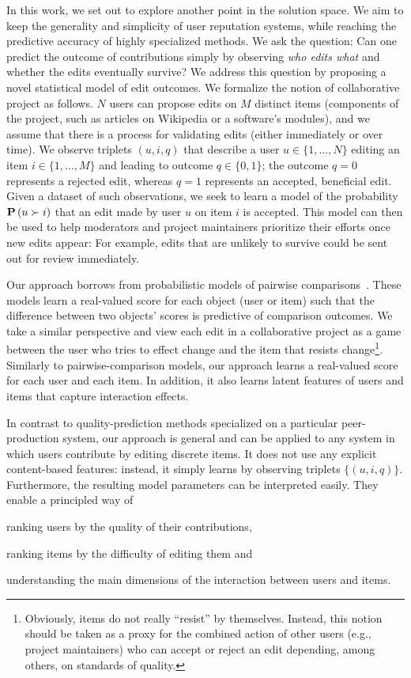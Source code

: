 In this work, we set out to explore another point in the solution space.
We aim to keep the generality and simplicity of user reputation systems, while reaching the predictive accuracy of highly specialized methods.
We ask the question:
Can one predict the outcome of contributions simply by observing \emph{who edits what} and whether the edits eventually survive?
We address this question by proposing a novel statistical model of edit outcomes.
We formalize the notion of collaborative project as follows.
$N$ users can propose edits on $M$ distinct items (components of the project, such as articles on Wikipedia or a software's modules), and we assume that there is a process for validating edits (either immediately or over time).
We observe triplets $(u, i, q)$ that describe a user $u \in \{1, \ldots, N\}$ editing an item $i \in \{1, \ldots, M\}$ and leading to outcome $q \in \{0, 1\}$;
the outcome $q = 0$ represents a rejected edit, whereas $q = 1$ represents an accepted, beneficial edit.
Given a dataset of such observations, we seek to learn a model of the probability $\mathbf{P}\left( u \succ i \right)$ that an edit made by user $u$ on item $i$ is accepted.
This model can then be used to help moderators and project maintainers prioritize their efforts once new edits appear:
For example, edits that are unlikely to survive could be sent out for review immediately.

Our approach borrows from probabilistic models of pairwise comparisons~\citep{zermelo1928berechnung, rasch1960probabilistic}.
These models learn a real-valued score for each object (user or item) such that the difference between two objects' scores is predictive of comparison outcomes.
We take a similar perspective and view each edit in a collaborative project as a game between the user who tries to effect change and the item that resists change\footnote{Obviously, items do not really ``resist'' by themselves. Instead, this notion should be taken as a proxy for the combined action of other users (e.g., project maintainers) who can accept or reject an edit depending, among others, on standards of quality.}.
Similarly to pairwise-comparison models, our approach learns a real-valued score for each user and each item.
In addition, it also learns latent features of users and items that capture interaction effects.

In contrast to quality-prediction methods specialized on a particular peer-production system, our approach is general and can be applied to any system in which users contribute by editing discrete items.
It does not use any explicit content-based features: instead, it simply learns by observing triplets $\{ (u, i, q) \}$.
Furthermore, the resulting model parameters can be interpreted easily.
They enable a principled way of
\begin{enuminline}
	\item ranking users by the quality of their contributions,
	\item ranking items by the difficulty of editing them and
	\item understanding the main dimensions of the interaction between users and items.
\end{enuminline}

